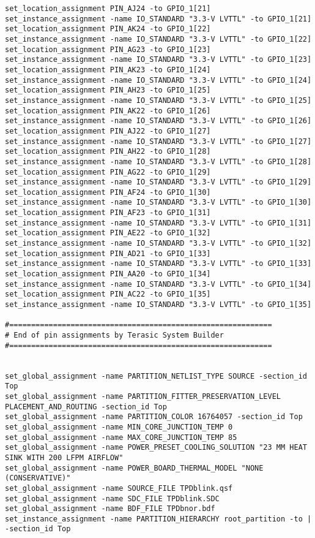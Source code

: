 \begin{verbatim}
set_location_assignment PIN_AJ24 -to GPIO_1[21]
set_instance_assignment -name IO_STANDARD "3.3-V LVTTL" -to GPIO_1[21]
set_location_assignment PIN_AK24 -to GPIO_1[22]
set_instance_assignment -name IO_STANDARD "3.3-V LVTTL" -to GPIO_1[22]
set_location_assignment PIN_AG23 -to GPIO_1[23]
set_instance_assignment -name IO_STANDARD "3.3-V LVTTL" -to GPIO_1[23]
set_location_assignment PIN_AK23 -to GPIO_1[24]
set_instance_assignment -name IO_STANDARD "3.3-V LVTTL" -to GPIO_1[24]
set_location_assignment PIN_AH23 -to GPIO_1[25]
set_instance_assignment -name IO_STANDARD "3.3-V LVTTL" -to GPIO_1[25]
set_location_assignment PIN_AK22 -to GPIO_1[26]
set_instance_assignment -name IO_STANDARD "3.3-V LVTTL" -to GPIO_1[26]
set_location_assignment PIN_AJ22 -to GPIO_1[27]
set_instance_assignment -name IO_STANDARD "3.3-V LVTTL" -to GPIO_1[27]
set_location_assignment PIN_AH22 -to GPIO_1[28]
set_instance_assignment -name IO_STANDARD "3.3-V LVTTL" -to GPIO_1[28]
set_location_assignment PIN_AG22 -to GPIO_1[29]
set_instance_assignment -name IO_STANDARD "3.3-V LVTTL" -to GPIO_1[29]
set_location_assignment PIN_AF24 -to GPIO_1[30]
set_instance_assignment -name IO_STANDARD "3.3-V LVTTL" -to GPIO_1[30]
set_location_assignment PIN_AF23 -to GPIO_1[31]
set_instance_assignment -name IO_STANDARD "3.3-V LVTTL" -to GPIO_1[31]
set_location_assignment PIN_AE22 -to GPIO_1[32]
set_instance_assignment -name IO_STANDARD "3.3-V LVTTL" -to GPIO_1[32]
set_location_assignment PIN_AD21 -to GPIO_1[33]
set_instance_assignment -name IO_STANDARD "3.3-V LVTTL" -to GPIO_1[33]
set_location_assignment PIN_AA20 -to GPIO_1[34]
set_instance_assignment -name IO_STANDARD "3.3-V LVTTL" -to GPIO_1[34]
set_location_assignment PIN_AC22 -to GPIO_1[35]
set_instance_assignment -name IO_STANDARD "3.3-V LVTTL" -to GPIO_1[35]

#============================================================
# End of pin assignments by Terasic System Builder
#============================================================


set_global_assignment -name PARTITION_NETLIST_TYPE SOURCE -section_id Top
set_global_assignment -name PARTITION_FITTER_PRESERVATION_LEVEL PLACEMENT_AND_ROUTING -section_id Top
set_global_assignment -name PARTITION_COLOR 16764057 -section_id Top
set_global_assignment -name MIN_CORE_JUNCTION_TEMP 0
set_global_assignment -name MAX_CORE_JUNCTION_TEMP 85
set_global_assignment -name POWER_PRESET_COOLING_SOLUTION "23 MM HEAT SINK WITH 200 LFPM AIRFLOW"
set_global_assignment -name POWER_BOARD_THERMAL_MODEL "NONE (CONSERVATIVE)"
set_global_assignment -name SOURCE_FILE TPDblink.qsf
set_global_assignment -name SDC_FILE TPDblink.SDC
set_global_assignment -name BDF_FILE TPDbnor.bdf
set_instance_assignment -name PARTITION_HIERARCHY root_partition -to | -section_id Top


\end{verbatim}
